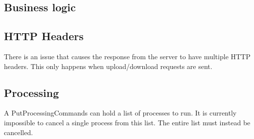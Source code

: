 \subsection{Business logic}

\subsection{HTTP Headers}

There is an issue that causes the response from the server to have multiple HTTP headers. This only happens when upload/download requests are sent.

\subsection{Processing}

A PutProcessingCommands can hold a list of processes to run. It is currently impossible to cancel a single process from this list. The entire list must instead be cancelled.
